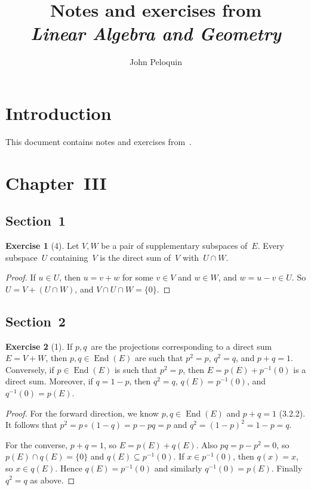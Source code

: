\documentclass[letterpaper,12pt]{article}
\title{Notes and exercises from\\\textit{Linear Algebra and Geometry}}
\author{John Peloquin}
\date{}
\newcommand{\sect}{\cap}
\newcommand{\after}{\circ}
\DeclareMathOperator{\End}{End}
\newcommand{\inv}[1]{#1^{-1}}
\newcommand{\kerz}[1]{\inv{#1}(0)}
\theoremstyle{definition}
\newtheorem*{exer}{Exercise}
\theoremstyle{remark}
\begin{document}
\maketitle

\section*{Introduction}
This document contains notes and exercises from~\cite{dieudonne}.

\section*{Chapter~III}
\subsection*{Section~1}
\begin{exer}[4]
Let \(V,W\) be a pair of supplementary subspaces of~\(E\). Every subspace~\(U\) containing~\(V\) is the direct sum of~\(V\) with~\(U\sect W\).
\end{exer}
\begin{proof}
If \(u\in U\), then \(u=v+w\) for some \(v\in V\) and \(w\in W\), and \(w=u-v\in U\). So \(U=V+(U\sect W)\), and \(V\sect U\sect W=\{0\}\).
\end{proof}

\subsection*{Section~2}
\begin{exer}[1]
If \(p,q\)~are the projections corresponding to a direct sum \(E=V+W\), then \(p,q\in\End(E)\) are such that \(p^2=p\), \(q^2=q\), and \(p+q=1\). Conversely, if \(p\in\End(E)\) is such that \(p^2=p\), then \(E=p(E)+\kerz{p}\) is a direct sum. Moreover, if \(q=1-p\), then \(q^2=q\), \(q(E)=\kerz{p}\), and \(\kerz{q}=p(E)\).
\end{exer}
\begin{proof}
For the forward direction, we know \(p,q\in\End(E)\) and \(p+q=1\) (3.2.2). It follows that \(p^2=p\after(1-q)=p-pq=p\) and \(q^2=(1-p)^2=1-p=q\).

For the converse, \(p+q=1\), so \(E=p(E)+q(E)\). Also \(pq=p-p^2=0\), so \(p(E)\sect q(E)=\{0\}\) and \(q(E)\subseteq\kerz{p}\). If \(x\in\kerz{p}\), then \(q(x)=x\), so \(x\in q(E)\). Hence \(q(E)=\kerz{p}\) and similarly \(\kerz{q}=p(E)\). Finally \(q^2=q\) as above.
\end{proof}
\end{document}
